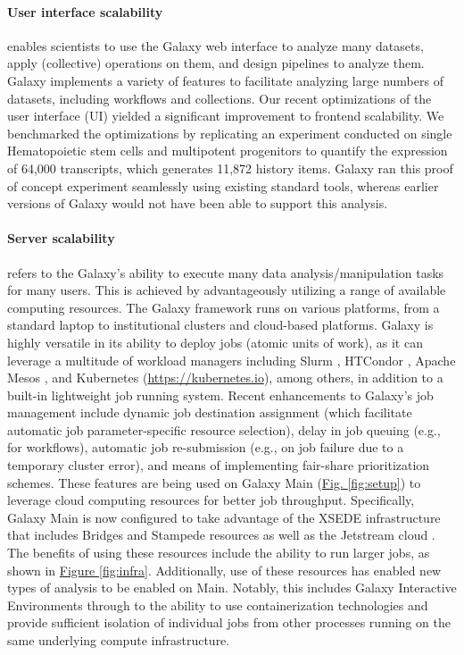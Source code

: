 \paragraph*{User interface scalability} enables scientists to use the Galaxy web interface to analyze many datasets, apply (collective) operations on them, and design pipelines to analyze them. Galaxy implements a variety of features to facilitate analyzing large numbers of datasets, including workflows and collections. Our recent optimizations of the user interface (UI) yielded a significant improvement to frontend scalability. We benchmarked the optimizations by replicating an experiment conducted on single Hematopoietic stem cells and multipotent progenitors \cite{yang2016single} to quantify the expression of 64,000 transcripts, which generates 11,872 history items. Galaxy ran this proof of concept experiment seamlessly using existing standard tools, whereas earlier versions of Galaxy would not have been able to support this analysis.

\paragraph*{Server scalability} refers to the Galaxy’s ability to execute many data analysis/manipulation tasks for many users. This is achieved by advantageously utilizing a range of available computing resources. The Galaxy framework runs on various platforms, from a standard laptop to institutional clusters and cloud-based platforms. Galaxy is highly versatile in its ability to deploy jobs (atomic units of work), as it can leverage a multitude of workload managers including Slurm \cite{yoo2003slurm}, HTCondor \cite{thain2005distributed}, Apache Mesos \cite{hindman2011mesos}, and Kubernetes (\url{https://kubernetes.io}), among others, in addition to a built-in lightweight job running system. Recent enhancements to Galaxy’s job management include dynamic job destination assignment (which facilitate automatic job parameter-specific resource selection), delay in job queuing (e.g., for workflows), automatic job re-submission (e.g., on job failure due to a temporary cluster error), and means of implementing fair-share prioritization schemes. These features are being used on Galaxy Main (\hyperref[fig:setup]{Fig. \ref{fig:setup}}) to leverage cloud computing resources for better job throughput. Specifically, Galaxy Main is now configured to take advantage of the XSEDE infrastructure \cite{towns2014xsede} that includes Bridges and Stampede resources as well as the Jetstream cloud \cite{stewart2015jetstream}. The benefits of using these resources include the ability to run larger jobs, as shown in \hyperref[fig:infra]{Figure \ref{fig:infra}}. Additionally, use of these resources has enabled new types of analysis to be enabled on Main. Notably, this includes Galaxy Interactive Environments through to the ability to use containerization technologies and provide sufficient isolation of individual jobs from other processes running on the same underlying compute infrastructure.

